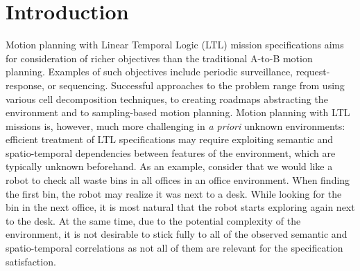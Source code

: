 \section{Introduction}


Motion planning with Linear Temporal Logic (LTL) mission specifications aims for consideration of richer objectives than the traditional A-to-B motion planning. Examples of such objectives include periodic surveillance, request-response, or sequencing. Successful approaches to the problem range from using various cell decomposition techniques, to creating roadmaps abstracting the environment and to sampling-based motion planning. Motion planning with LTL missions is, however, much more challenging in \emph{a priori} unknown environments: efficient treatment of LTL specifications may require exploiting semantic and spatio-temporal dependencies between features of the environment, which are typically unknown beforehand. As an example, consider that we would like a robot to check all waste bins in all offices in an office environment. When finding the first bin, the robot may realize it was next to a desk. While looking for the bin in the next office, it is most natural that the robot starts exploring again next to the desk. At the same time, due to the potential complexity of the environment, it is not desirable to stick fully to all of the observed semantic and spatio-temporal correlations as not all of them are relevant for the specification satisfaction.


